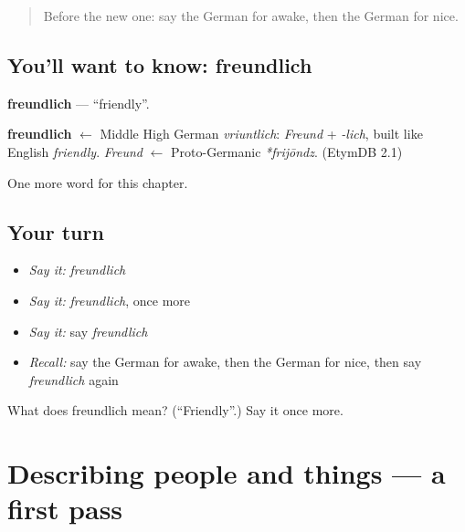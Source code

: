 \label{lesson:GE-C132-freundlich}



\begin{quote}
Before the new one: say the German for awake, then the German for nice.
\end{quote}

\subsection*{You'll want to know: freundlich}
\textbf{freundlich} — \textquotedblleft{}friendly\textquotedblright{}.

\begin{cousinweb}
\textbf{freundlich} $\leftarrow$ Middle High German \emph{vriuntlich}: \emph{Freund} + \emph{-lich}, built like English \emph{friendly}. \emph{Freund} $\leftarrow$ Proto-Germanic \emph{*frijōndz}. (EtymDB 2.1)
\end{cousinweb}

\begin{grammarlens}[title={What you've built}]
One more word for this chapter.
\end{grammarlens}

\subsection*{Your turn}
\begin{itemize}
\raggedright
  \item \emph{Say it:} \emph{freundlich}
  \item \emph{Say it:} \emph{freundlich}, once more
  \item \emph{Say it:} say \emph{freundlich}
  \item \emph{Recall:} say the German for awake, then the German for nice, then say \emph{freundlich} again
\end{itemize}

\begin{tcolorbox}[breakable,colback=teal!4,colframe=teal!35!black,title={Before you move on}]
What does freundlich mean? (\textquotedblleft{}Friendly\textquotedblright{}.) Say it once more.
\end{tcolorbox}
\section[(dialogue)]{Describing people and things — a first pass}

\label{lesson:GE-R132-first-pass-describing-people-and-things}



